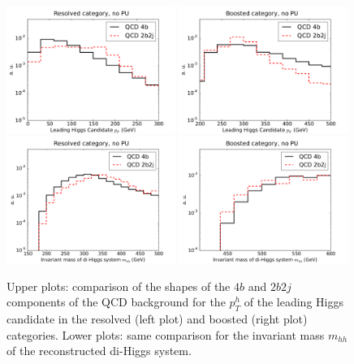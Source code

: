 \begin{figure}[t]
\begin{center}
 \includegraphics[width=0.49\textwidth]{plots/pt_h0_C2_res_back_noPU.pdf}
 \includegraphics[width=0.49\textwidth]{plots/pt_h0_C2_bst_back_noPU.pdf}
  \includegraphics[width=0.49\textwidth]{plots/m_hh_C2_res_back_noPU.pdf}
  \includegraphics[width=0.49\textwidth]{plots/m_hh_C2_bst_back_noPU.pdf}
  \caption{\small
    Upper plots: comparison
    of the shapes of the $4b$ and $2b2j$
components of the QCD background for the $p_T^h$ of the leading
Higgs candidate in the resolved
(left plot) and boosted (right plot) categories.
Lower plots:  same comparison for the invariant
mass $m_{hh}$ of the
    reconstructed di-Higgs system.
}
\label{fig:histoBack}
\end{center}
\end{figure}

